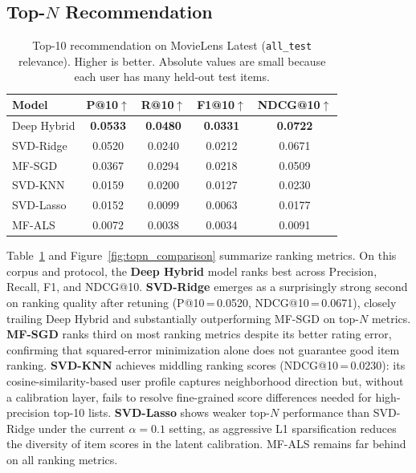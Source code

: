 \documentclass[11pt]{article}
\begin{document}
\subsection{\texorpdfstring{Top-$N$}{Top-N} Recommendation}

\begin{table}[t]
\centering
\footnotesize
\setlength{\tabcolsep}{3pt}
\begin{tabular}{lcccc}
\toprule
\textbf{Model} & \textbf{P@10}$\uparrow$ & \textbf{R@10}$\uparrow$ & \textbf{F1@10}$\uparrow$ & \textbf{NDCG@10}$\uparrow$ \\
\midrule
Deep Hybrid & \textbf{0.0533} & \textbf{0.0480} & \textbf{0.0331} & \textbf{0.0722} \\
SVD-Ridge   & 0.0520 & 0.0240 & 0.0212 & 0.0671 \\
MF-SGD      & 0.0367 & 0.0294 & 0.0218 & 0.0509 \\
SVD-KNN     & 0.0159 & 0.0200 & 0.0127 & 0.0230 \\
SVD-Lasso   & 0.0152 & 0.0099 & 0.0063 & 0.0177 \\
MF-ALS      & 0.0072 & 0.0038 & 0.0034 & 0.0091 \\
\bottomrule
\end{tabular}
\caption{Top-10 recommendation on MovieLens Latest (\texttt{all\_test} relevance).  Higher is better.  Absolute values are small because each user has many held-out test items.}
\label{tab:topn_results}
\end{table}

Table~\ref{tab:topn_results} and Figure~\ref{fig:topn_comparison} summarize ranking metrics.
On this corpus and protocol, the \textbf{Deep Hybrid} model ranks best across Precision, Recall, F1, and NDCG@10.
\textbf{SVD-Ridge} emerges as a surprisingly strong second on ranking quality after retuning (P@10\,=\,0.0520, NDCG@10\,=\,0.0671), closely trailing Deep Hybrid and substantially outperforming MF-SGD on top-$N$ metrics.
\textbf{MF-SGD} ranks third on most ranking metrics despite its better rating error, confirming that squared-error minimization alone does not guarantee good item ranking.
\textbf{SVD-KNN} achieves middling ranking scores (NDCG@10\,=\,0.0230): its cosine-similarity-based user profile captures neighborhood direction but, without a calibration layer, fails to resolve fine-grained score differences needed for high-precision top-10 lists.
\textbf{SVD-Lasso} shows weaker top-$N$ performance than SVD-Ridge under the current $\alpha{=}0.1$ setting, as aggressive L1 sparsification reduces the diversity of item scores in the latent calibration.
MF-ALS remains far behind on all ranking metrics.
\end{document}
